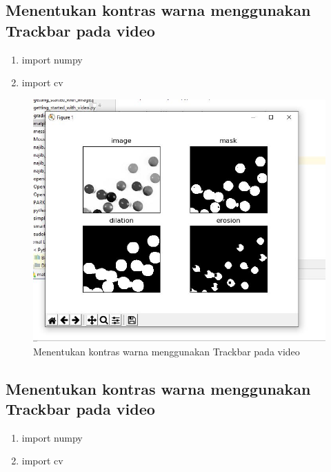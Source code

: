 \newpage
\subsection{Menentukan kontras warna menggunakan Trackbar pada video}

\begin{enumerate}
	\item import numpy
	\item import cv
\end{enumerate}

\newpage
\begin{figure}[ht]
\centering
\includegraphics[scale=0.5]{figures/2,54.jpg}
\caption{Menentukan kontras warna menggunakan Trackbar pada video}
\label{contoh}
\end{figure}







\newpage
\subsection{Menentukan kontras warna menggunakan Trackbar pada video}

\begin{enumerate}
	\item import numpy
	\item import cv
\end{enumerate}

